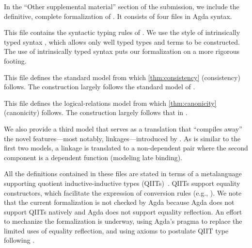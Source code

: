 In the ``Other supplemental material'' section of the submission, we
include the definitive, complete formalization of \TT.
It consists of four files in Agda syntax.
%

\begin{description}[
    itemsep=.5ex,topsep=.6ex,
    labelsep=1.5ex,
    leftmargin=6.5ex,
    font=\ttfamily\bfseries,
]

\item[Syntax.agda]

This file contains the syntactic typing rules of \TT.
We use the style of intrinsically typed syntax \cite{chapman2009type},
which allows only well typed \TT types and terms to be constructed.
The use of intrinsically typed syntax puts our formalization on a more
rigorous footing.

\item[Semantic.agda]

This file defines the standard model from which
\cref{thm:consistency} (consistency) follows.
%
The construction largely follows the standard model of
\cite{altkap2016,kaposi2017type,kaposi2019gluing}.

\item[Canonicity.agda]

This file defines the logical-relations model from which
\cref{thm:canonicity} (canonicity) follows.
%
The construction largely follows that in
\cite{coquand2018canonicity,sterling2019algebraic}.

\item[SynTranslation.agda]

We also provide a third model that serves as a translation that ``compiles
away'' the novel features---most notably, linkages---introduced by \TT.
As is similar to the first two models, 
a linkage is translated to a non-dependent pair where the
second component is a dependent function (modeling late binding).

\end{description}

All the definitions contained in these files are stated in
terms of a meta\-language supporting quotient inductive-inductive types
(QIITs)~\cite{nordvall2010inductive,altkap2016}.
QIITs support equality constructors, which facilitate the expression of
conversion rules (e.g., ).
%
We note that the current formalization is not checked by Agda because
Agda does not support QIITs natively and Agda does not support equality reflection.
An effort to mechanize the formalization is underway, using Agda's
 pragma to replace the limited uses of equality reflection, 
and using axioms to postulate QIIT type following \cite{altkap2016}.

